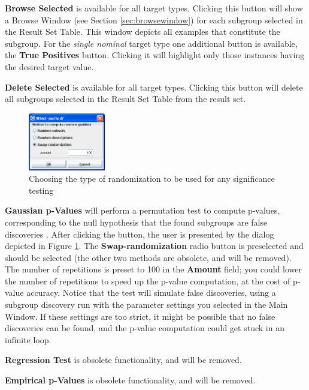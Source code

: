 \documentclass{article}
\begin{document}
\textbf{Browse Selected} is available for all target types.  Clicking this
button will show a Browse Window (see Section \ref{sec:browsewindow}) for
each subgroup selected in the Result Set Table.  This window depicts all
examples that constitute the subgroup.  For the \emph{single nominal} target
type one additional button is available, the \textbf{True Positives} button. 
Clicking it will highlight only those instances having the desired target
value.

\textbf{Delete Selected} is available for all target types. Clicking this
button will delete all subgroups selected in the Result Set Table from the
result set.

\begin{figure}[t]
\begin{center}
\includegraphics[width=0.3\textwidth]{randomizationdialog.png}
\caption{Choosing the type of randomization to be used for any significance testing}
\end{center}
\label{fig:randomizationdialog}
\end{figure}

\textbf{Gaussian p-Values} will perform a permutation test to compute
p-values, corresponding to the null hypothesis that the found subgroups are
false discoveries \cite{2011Duivesteijn}.  After clicking the button, the
user is presented by the dialog depicted in Figure
\ref{fig:randomizationdialog}.  The \textbf{Swap-randomization} radio button
is preselected and should be selected (the other two methods are obsolete,
and will be removed).  The number of repetitions is preset to 100 in the
\textbf{Amount} field; you could lower the number of repetitions to speed up
the p-value computation, at the cost of p-value accuracy.  Notice that the
test will simulate false discoveries, using a subgroup discovery run with
the parameter settings you selected in the Main Window.  If these settings
are too strict, it might be possible that no false discoveries can be found,
and the p-value computation could get stuck in an infinite loop.

\textbf{Regression Test} is obsolete functionality, and will be removed.

\textbf{Empirical p-Values} is obsolete functionality, and will be removed.
\end{document}
